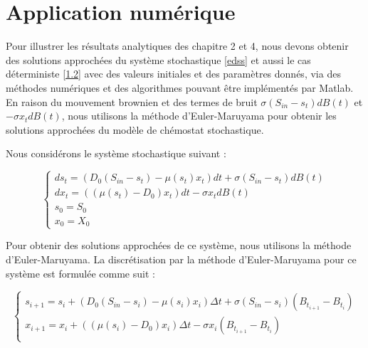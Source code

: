 \documentclass[12pt,a4paper]{report}%
\begin{document}
\section{Application numérique }%
Pour illustrer les résultats analytiques des chapitre 2 et 4, nous devons obtenir des solutions approchées du système stochastique \eqref{edss} et aussi le cas déterministe \eqref{1.2} avec des valeurs initiales et des paramètres donnés, via des méthodes numériques et des algorithmes pouvant être implémentés par Matlab. En raison du mouvement brownien et des termes de bruit $\sigma(S_{in} - s_t) dB(t)$ et $-\sigma x_t dB(t)$, nous utilisons la méthode d'Euler-Maruyama pour obtenir les solutions approchées du modèle de chémostat stochastique.

Nous considérons le système stochastique suivant :

\begin{equation}\label{edssn}
\begin{cases}
ds_t = \left( D_0 \left(S_{in} - s_t\right) - \mu(s_t) x_t \right) dt + \sigma \left(S_{in} - s_t\right) dB(t) \\
dx_t = \left( (\mu(s_t) - D_0) x_t \right) dt - \sigma x_t dB(t) \\
s_0 = S_0 \\
x_0 = X_0
\end{cases}
\end{equation}

Pour obtenir des solutions approchées de ce système, nous utilisons la méthode d'Euler-Maruyama. La discrétisation par la méthode d'Euler-Maruyama pour ce système est formulée comme suit :

\begin{equation}\label{matlab1}
\begin{cases}
s_{i+1} = s_i + \left( D_0 (S_{in} - s_i) - \mu(s_i) x_i \right) \Delta t + \sigma (S_{in} - s_i) (B_{t_{i+1}} - B_{t_i}) \\
x_{i+1} = x_i + \left( (\mu(s_i) - D_0) x_i \right) \Delta t - \sigma x_i (B_{t_{i+1}} - B_{t_i}) \\
\end{cases}
\end{equation}
\end{document}
